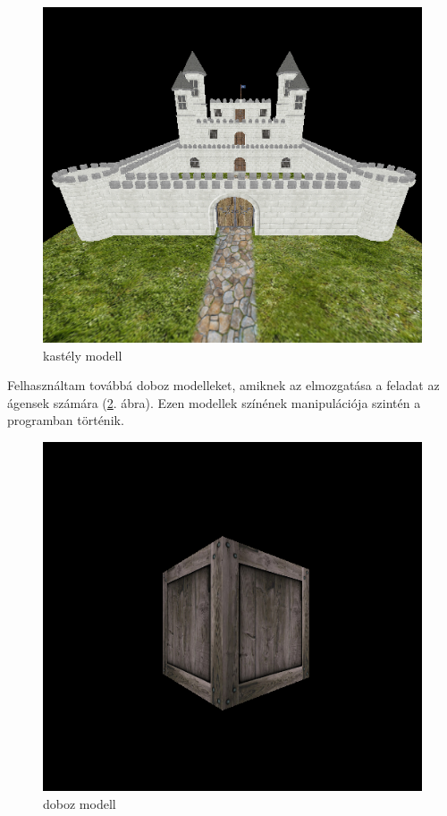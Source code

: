 \begin{figure}[htp]
    \centering
   	\includegraphics[scale=0.7]{images/castle.png}
	\caption{kastély modell}
	\label{fig:castle}
\end{figure}

Felhasználtam továbbá doboz modelleket, amiknek az elmozgatása a feladat az ágensek számára (\ref{fig:box}. ábra). Ezen modellek színének manipulációja szintén a programban történik.

\begin{figure}[htp]
    \centering
   	\includegraphics[scale=0.5]{images/box.png}
	\caption{doboz modell}
	\label{fig:box}
\end{figure}

